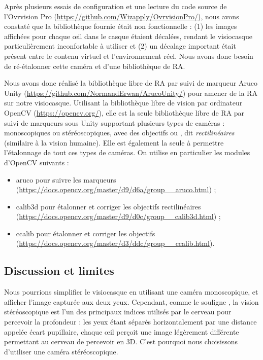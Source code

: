Après plusieurs essais de configuration et une lecture du code source de l'Ovrvision Pro (\url{https://github.com/Wizapply/OvrvisionPro/}), nous avons constaté que la bibliothèque fournie était non fonctionnelle : (1) les images affichées pour chaque \oe il dans le casque étaient décalées, rendant le visiocasque particulièrement inconfortable à utiliser et (2) un décalage important était présent entre le contenu virtuel et l'environnement réel. Nous avons donc besoin de ré-étalonner cette caméra et d'une bibliothèque de RA.

Nous avons donc réalisé la bibliothèque libre de RA par suivi de marqueur Aruco Unity (\url{https://github.com/NormandErwan/ArucoUnity/}) pour amener de la RA sur notre visiocasque. Utilisant la bibliothèque libre de vision par ordinateur OpenCV (\url{https://opencv.org/}), elle est la seule bibliothèque libre de RA par suivi de marqueurs sous Unity supportant plusieurs types de caméras : monoscopiques ou stéréoscopiques, avec des objectifs  ou , dit \emph{rectilinéaires} (similaire à la vision humaine). Elle est également la seule à permettre l'étalonnage de tout ces types de caméras. On utilise en particulier les modules d'OpenCV suivants :
\begin{itemize}
  \item aruco pour suivre les marqueurs (\url{https://docs.opencv.org/master/d9/d6a/group__aruco.html}) ;
  \item calib3d pour étalonner et corriger les objectifs rectilinéaires (\url{https://docs.opencv.org/master/d9/d0c/group__calib3d.html}) ;
  \item ccalib pour étalonner et corriger les objectifs  (\url{https://docs.opencv.org/master/d3/ddc/group__ccalib.html}).
\end{itemize}


\subsection{Discussion et limites}
\label{subsec:solution_discusion}
Nous pourrions simplifier le visiocasque en utilisant une caméra monoscopique, et afficher l'image capturée aux deux yeux. Cependant, comme le souligne \cite{Bourke1999}, la vision stéréoscopique est l'un des principaux indices utilisés par le cerveau pour percevoir la profondeur : les yeux étant séparés horizontalement par une distance appelée écart pupillaire, chaque \oe il perçoit une image légèrement différente  permettant au cerveau de percevoir en 3D. C'est pourquoi nous choisissons d'utiliser une caméra stéréoscopique.

